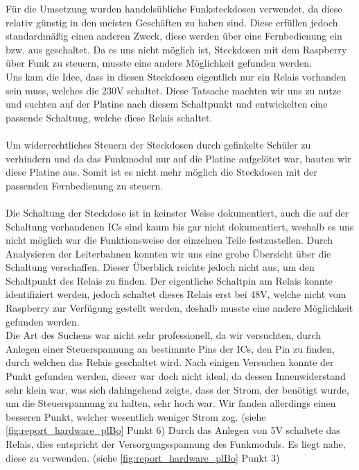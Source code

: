 Für die Umsetzung wurden handelsübliche Funksteckdosen verwendet, da diese relativ günstig in den meisten Geschäften zu haben sind. Diese erfüllen jedoch standardmäßig einen anderen Zweck, diese werden über eine Fernbedienung ein bzw. aus geschaltet. Da es uns nicht möglich ist, Steckdosen mit dem Raspberry über Funk zu steuern, musste eine andere Möglichkeit gefunden werden.\\
Uns kam die Idee, dass in diesen Steckdosen eigentlich nur ein Relais vorhanden sein muss, welches die 230V schaltet. Diese Tatsache machten wir uns zu nutze und suchten auf der Platine nach diesem Schaltpunkt und entwickelten eine passende Schaltung, welche diese Relais schaltet.\\\\
Um widerrechtliches Steuern der Steckdosen durch gefinkelte Schüler zu verhindern und da das Funkmodul nur auf die Platine aufgelötet war, bauten wir diese Platine aus. Somit ist es nicht mehr möglich die Steckdosen mit der passenden Fernbedienung zu steuern.\\\\
Die Schaltung der Steckdose ist in keinster Weise dokumentiert, auch die auf der Schaltung vorhandenen ICs sind kaum bis gar nicht dokumentiert, weshalb es uns nicht möglich war die Funktionsweise der einzelnen Teile festzustellen. Durch Analysieren der Leiterbahnen konnten wir uns eine grobe Übersicht über die Schaltung verschaffen. Dieser Überblick reichte jedoch nicht aus, um den Schaltpunkt des Relais zu finden. Der eigentliche Schaltpin am Relais konnte identifiziert werden, jedoch schaltet dieses Relais erst bei 48V, welche nicht vom Raspberry zur Verfügung gestellt werden, deshalb musste eine andere Möglichkeit gefunden werden.\\
Die Art des Suchens war nicht sehr professionell, da wir versuchten, durch Anlegen einer Steuerspannung an bestimmte Pins der ICs, den Pin zu finden, durch welchen das Relais geschaltet wird. Nach einigen Versuchen konnte der Punkt gefunden werden, dieser war doch nicht ideal, da dessen Innenwiderstand sehr klein war, was sich dahingehend zeigte, dass der Strom, der benötigt wurde, um die Steuerspannung zu halten, sehr hoch war. Wir fanden allerdings einen besseren Punkt, welcher wesentlich weniger Strom zog. (siehe \autoref{fig:report_hardware_plBo} Punkt 6) Durch das Anlegen von 5V schaltete das Relais, dies entspricht der Versorgungsspannung des Funkmoduls. Es liegt nahe, diese zu verwenden. (siehe \autoref{fig:report_hardware_plBo} Punkt 3)\\\\

